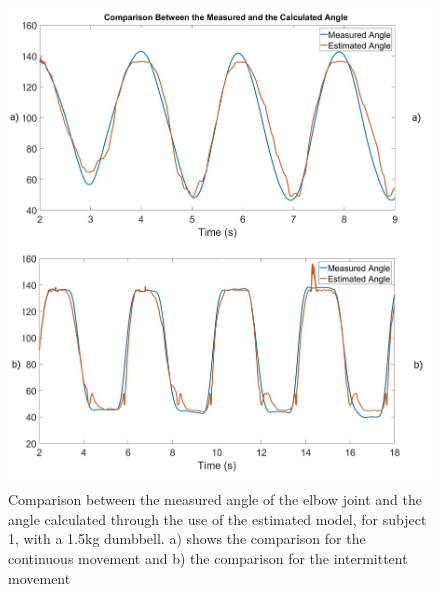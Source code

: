 \documentclass[letterpaper, 10 pt, conference]{ieeeconf}  %
\begin{document}
\begin{figure}[thpb]
      \centering
      \includegraphics[width=0.98\columnwidth]{Images/comparison.jpg}
      \caption{Comparison between the measured angle of the elbow joint and the angle calculated through the use of the estimated model, for subject 1, with a 1.5kg dumbbell. a) shows the comparison for the continuous movement and b) the comparison for the intermittent movement}
      \label{Angle Comparison}
   \end{figure}
   
\end{document}
